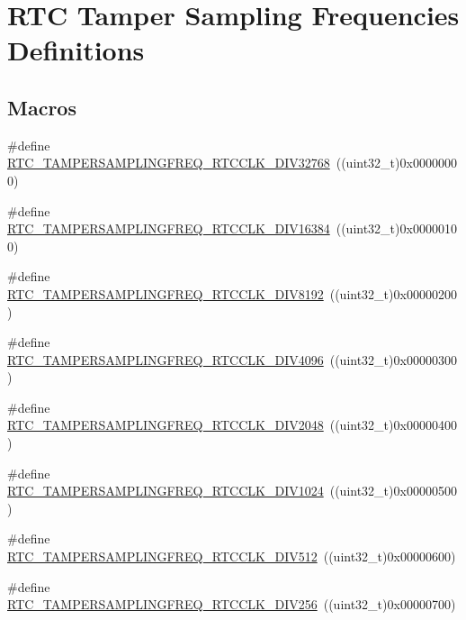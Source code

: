 \hypertarget{group___r_t_c_ex___tamper___sampling___frequencies___definitions}{}\section{R\+TC Tamper Sampling Frequencies Definitions}
\label{group___r_t_c_ex___tamper___sampling___frequencies___definitions}
\subsection*{Macros}
\begin{DoxyCompactItemize}
\item 
\#define \hyperlink{group___r_t_c_ex___tamper___sampling___frequencies___definitions_ga1d12bab8de77c51edc1b6a7a2e242991}{R\+T\+C\+\_\+\+T\+A\+M\+P\+E\+R\+S\+A\+M\+P\+L\+I\+N\+G\+F\+R\+E\+Q\+\_\+\+R\+T\+C\+C\+L\+K\+\_\+\+D\+I\+V32768}~((uint32\+\_\+t)0x00000000)
\item 
\#define \hyperlink{group___r_t_c_ex___tamper___sampling___frequencies___definitions_gab45c084cd1f2f36ecb19d7eb4e7c12b2}{R\+T\+C\+\_\+\+T\+A\+M\+P\+E\+R\+S\+A\+M\+P\+L\+I\+N\+G\+F\+R\+E\+Q\+\_\+\+R\+T\+C\+C\+L\+K\+\_\+\+D\+I\+V16384}~((uint32\+\_\+t)0x00000100)
\item 
\#define \hyperlink{group___r_t_c_ex___tamper___sampling___frequencies___definitions_ga48899e13c9b392c02278cd4166b49f4d}{R\+T\+C\+\_\+\+T\+A\+M\+P\+E\+R\+S\+A\+M\+P\+L\+I\+N\+G\+F\+R\+E\+Q\+\_\+\+R\+T\+C\+C\+L\+K\+\_\+\+D\+I\+V8192}~((uint32\+\_\+t)0x00000200)
\item 
\#define \hyperlink{group___r_t_c_ex___tamper___sampling___frequencies___definitions_gaa8257b2329aa2d170b66b7368c11943a}{R\+T\+C\+\_\+\+T\+A\+M\+P\+E\+R\+S\+A\+M\+P\+L\+I\+N\+G\+F\+R\+E\+Q\+\_\+\+R\+T\+C\+C\+L\+K\+\_\+\+D\+I\+V4096}~((uint32\+\_\+t)0x00000300)
\item 
\#define \hyperlink{group___r_t_c_ex___tamper___sampling___frequencies___definitions_ga681034d8247a44679e3ae277db187cb5}{R\+T\+C\+\_\+\+T\+A\+M\+P\+E\+R\+S\+A\+M\+P\+L\+I\+N\+G\+F\+R\+E\+Q\+\_\+\+R\+T\+C\+C\+L\+K\+\_\+\+D\+I\+V2048}~((uint32\+\_\+t)0x00000400)
\item 
\#define \hyperlink{group___r_t_c_ex___tamper___sampling___frequencies___definitions_gaad315c353bdd84397cb1d7db46c71cd3}{R\+T\+C\+\_\+\+T\+A\+M\+P\+E\+R\+S\+A\+M\+P\+L\+I\+N\+G\+F\+R\+E\+Q\+\_\+\+R\+T\+C\+C\+L\+K\+\_\+\+D\+I\+V1024}~((uint32\+\_\+t)0x00000500)
\item 
\#define \hyperlink{group___r_t_c_ex___tamper___sampling___frequencies___definitions_ga3748ae21496570bdc54354c7d9a8c91d}{R\+T\+C\+\_\+\+T\+A\+M\+P\+E\+R\+S\+A\+M\+P\+L\+I\+N\+G\+F\+R\+E\+Q\+\_\+\+R\+T\+C\+C\+L\+K\+\_\+\+D\+I\+V512}~((uint32\+\_\+t)0x00000600)
\item 
\#define \hyperlink{group___r_t_c_ex___tamper___sampling___frequencies___definitions_ga05ce782cafcbf04e6854739041052a9e}{R\+T\+C\+\_\+\+T\+A\+M\+P\+E\+R\+S\+A\+M\+P\+L\+I\+N\+G\+F\+R\+E\+Q\+\_\+\+R\+T\+C\+C\+L\+K\+\_\+\+D\+I\+V256}~((uint32\+\_\+t)0x00000700)
\end{DoxyCompactItemize}


